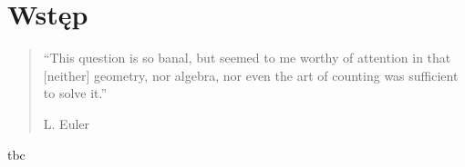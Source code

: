 \chapter*{Wstęp}

\blockquote[L. Euler]{\enquote{This question is so banal, but seemed to me worthy of attention in that [neither] geometry, nor algebra, nor even the art of counting was sufficient to solve it.}}

tbc

\thispagestyle{empty}
